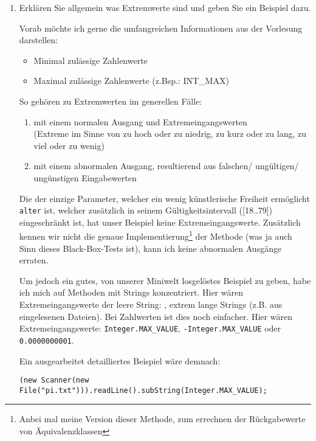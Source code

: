 \documentclass{article}
\newcommand{\gqq}[1]{\glqq{}#1\grqq{}}
\begin{document}
\begin{enumerate}[label=\alph*.]
        \item Erklären Sie allgemein was Extremwerte sind und geben Sie ein Beispiel dazu.
            
            Vorab möchte ich gerne die umfangreichen Informationen aus der Vorlesung darstellen:

            \begin{itemize}
                \item Minimal zulässige Zahlenwerte
                \item Maximal zulässige Zahlenwerte (z.Bsp.: INT\_MAX)
            \end{itemize}

            So gehören zu Extremwerten im generellen Fälle:
            \begin{enumerate}[label=\alph*.]
                \item mit einem normalen Ausgang und Extremeingangswerten\\
                    (Extreme im Sinne von zu hoch oder zu niedrig, zu kurz oder zu lang, zu viel oder zu wenig)
                \item mit einem abnormalen Ausgang, resultierend aus falschen/ ungültigen/ ungünstigen Eingabewerten
            \end{enumerate} 

            Die der einzige Parameter, welcher ein wenig künstlerische Freiheit ermöglicht \texttt{alter} ist, welcher zusätzlich in seinem Gültigkeitsintervall ([18..79]) eingeschränkt ist, hat unser Beispiel keine Extremeingangswerte.
            Zusätzlich kennen wir nicht die genaue Implementierung\footnote{Anbei mal meine Version dieser Methode, zum errechnen der Rückgabewerte von Äquivalenzklassen} der Methode (was ja auch Sinn dieses Black-Box-Tests ist), kann ich keine abnormalen Ausgänge erraten.

            Um jedoch ein gutes, von unserer Miniwelt losgelöstes Beispiel zu geben, habe ich mich auf Methoden mit Strings konzentriert.
            Hier wären Extremeingangswerte der leere String: \gqq{}, extrem lange Strings (z.B. aus eingelesenen Dateien).
            Bei Zahlwerten ist dies noch einfacher.
            Hier wären Extremeingangswerte: \texttt{Integer.MAX\_VALUE}, \texttt{-Integer.MAX\_VALUE} oder \texttt{0.0000000001}.

            Ein ausgearbeitet detailliertes Beispiel wäre demnach:
            \begin{verbatim}
(new Scanner(new File("pi.txt"))).readLine().subString(Integer.MAX_VALUE);
            \end{verbatim}
    \end{enumerate}
\end{document}
